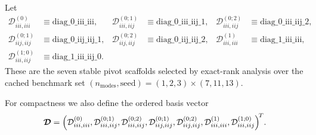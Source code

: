 \documentclass[11pt]{article}
\begin{document}
Let
\begin{align}
\mathcal{D}^{(0)}_{iii,iii} &\equiv \mathrm{diag\_0\_iii\_iii}, &
\mathcal{D}^{(0;1)}_{iii,iij} &\equiv \mathrm{diag\_0\_iii\_iij\_1}, &
\mathcal{D}^{(0;2)}_{iii,iij} &\equiv \mathrm{diag\_0\_iii\_iij\_2}, \\
\mathcal{D}^{(0;1)}_{iij,iij} &\equiv \mathrm{diag\_0\_iij\_iij\_1}, &
\mathcal{D}^{(0;2)}_{iij,iij} &\equiv \mathrm{diag\_0\_iij\_iij\_2}, &
\mathcal{D}^{(1)}_{iii,iii} &\equiv \mathrm{diag\_1\_iii\_iii}, \\
\mathcal{D}^{(1;0)}_{iii,iij} &\equiv \mathrm{diag\_1\_iii\_iij\_0}. &&
\end{align}
These are the seven stable pivot scaffolds selected by exact-rank analysis over
the cached benchmark set $(n_{\mathrm{modes}},\mathrm{seed}) = (1,2,3) \times (7,11,13)$.

For compactness we also define the ordered basis vector
\begin{equation}
\bm{\mathcal{D}} =
\Bigl(
\mathcal{D}^{(0)}_{iii,iii},
\mathcal{D}^{(0;1)}_{iii,iij},
\mathcal{D}^{(0;2)}_{iii,iij},
\mathcal{D}^{(0;1)}_{iij,iij},
\mathcal{D}^{(0;2)}_{iij,iij},
\mathcal{D}^{(1)}_{iii,iii},
\mathcal{D}^{(1;0)}_{iii,iij}
\Bigr)^{\!T}.
\end{equation}
\end{document}
